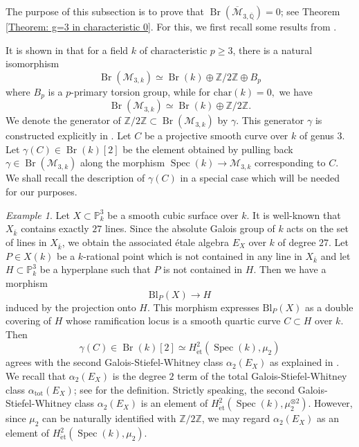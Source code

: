 \documentclass{amsart}
\theoremstyle{definition}
\theoremstyle{remark}
\newtheorem{examp}[prop]{Example}
\DeclareMathOperator{\Spec}{Spec}
\DeclareMathOperator{\Br}{Br}
\newcommand{\PP}{\mathbb P}
\newcommand{\ZZ}{\mathbb Z}
\newcommand{\QQ}{\mathbb Q}
\newcommand{\et}{\operatorname{\acute{e}t}}%
\begin{document}
The purpose of this subsection is to prove that
$\Br(\overline{\mathcal{M}}_{3, \overline{\QQ}})=0$; see Theorem \ref{Theorem: g=3 in characteristic 0}.
For this, we first recall some results from \cite{Lorenzo-Pirisi}.

It is shown in \cite{Lorenzo-Pirisi} that for a field $k$ of characteristic $p \geq 3$, there is a natural isomorphism
\[
\Br(\mathcal{M}_{3, k}) \simeq \Br(k) \oplus \ZZ/2\ZZ \oplus B_p
\]
where $B_p$ is a $p$-primary torsion group, while for $\text{char}(k)=0,$ we have
\[
\Br(\mathcal{M}_{3,k}) \simeq \Br(k) \oplus \ZZ / 2\ZZ.
\]
We denote the generator of
$\ZZ/2\ZZ \subset \Br(\mathcal{M}_{3, k})$
by $\gamma$.
This generator $\gamma$ is constructed explicitly in \cite{Lorenzo-Pirisi}.
Let $C$ be a projective smooth curve over $k$ of genus $3$.
Let $\gamma(C) \in \Br(k)[2]$ be the element obtained by pulling back $\gamma \in \Br(\mathcal{M}_{3, k})$ along the morphism $\Spec (k) \to \mathcal{M}_{3, k}$ corresponding to $C$.
We shall recall the description of $\gamma(C)$ in a special case which will be needed for our purposes.




\begin{examp}\label{Example: cubic surface and the description of gamma}
    Let $X \subset \PP^3_k$ be a smooth cubic surface over $k$.
    It is well-known that $X_{\overline{k}}$ contains exactly $27$ lines.
    Since the absolute Galois group of $k$ acts on the set of lines in $X_{\overline{k}}$, we obtain the associated \'etale algebra $E_X$ over $k$ of degree $27$.
    Let $P \in X(k)$ be a $k$-rational point which is not contained in any line in $X_{\overline{k}}$ and let
    $H \subset \PP^3_k$ be a hyperplane such that $P$ is not contained in $H$.
    Then we have a morphism
    \[
    \mathrm{Bl}_P (X) \to H
    \]
    induced by the projection onto $H$.
    This morphism expresses $\mathrm{Bl}_P (X)$ as a double covering of $H$ whose ramification locus is a smooth quartic curve $C \subset H$ over $k$.
    Then
    \[
    \gamma(C) \in \Br(k)[2] \simeq H^2_{\et}(\Spec (k), \mu_2)
    \]
    agrees with the second Galois-Stiefel-Whitney class $\alpha_2(E_X)$
    as explained in \cite[Section 3.4, Section 3.5]{Lorenzo-Pirisi}.
    We recall that $\alpha_2(E_X)$ is the degree $2$ term of the total Galois-Stiefel-Whitney class $\alpha_{\mathrm{tot}}(E_X)$; see \cite[Section 3.3]{Lorenzo-Pirisi} for the definition.
    Strictly speaking, the second Galois-Stiefel-Whitney class $\alpha_2(E_X)$ is an element of $H^2_{\et}(\Spec (k), \mu^{\otimes 2}_2)$.
    However, since $\mu_2$ can be naturally identified with $\ZZ/2\ZZ$, we may regard $\alpha_2(E_X)$ as an element of $H^2_{\et}(\Spec (k), \mu_2)$.
\end{examp}
\end{document}
